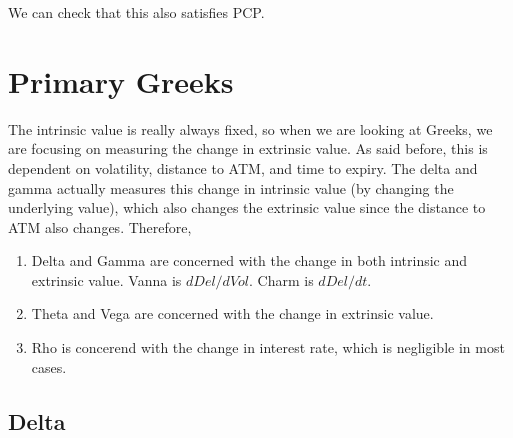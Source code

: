 \documentclass{article}
\begin{document}
    We can check that this also satisfies PCP. 

\section{Primary Greeks}

    The intrinsic value is really always fixed, so when we are looking at Greeks, we are focusing on measuring the change in extrinsic value. As said before, this is dependent on volatility, distance to ATM, and time to expiry. The delta and gamma actually measures this change in intrinsic value (by changing the underlying value), which also changes the extrinsic value since the distance to ATM also changes. Therefore,

    \begin{enumerate}
      \item Delta and Gamma are concerned with the change in both intrinsic and extrinsic value. Vanna is $d Del / d Vol$. Charm is $d Del / d t$.
      \item Theta and Vega are concerned with the change in extrinsic value.
      \item Rho is concerend with the change in interest rate, which is negligible in most cases.
    \end{enumerate}

  \subsection{Delta}
\end{document}
